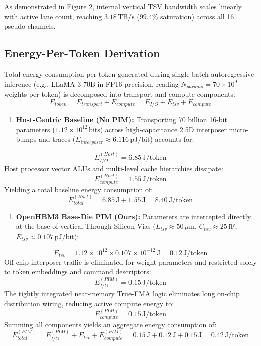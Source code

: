 \documentclass[journal,10pt,twocolumn]{IEEEtran}
\begin{document}
As demonstrated in Figure 2, internal vertical TSV bandwidth scales linearly with active lane count, reaching $3.18\,\text{TB/s}$ ($99.4\%$ saturation) across all 16 pseudo-channels.

\subsection{Energy-Per-Token Derivation}

Total energy consumption per token generated during single-batch autoregressive inference (e.g., LLaMA-3 70B in FP16 precision, reading $N_{params} = 70 \times 10^9$ weights per token) is decomposed into transport and compute components:
$$E_{token} = E_{transport} + E_{compute} = E_{I/O} + E_{tsv} + E_{compute}$$

\begin{enumerate}
  \item \textbf{Host-Centric Baseline (No PIM):}
Transporting 70 billion 16-bit parameters ($1.12 \times 10^{12}\,\text{bits}$) across high-capacitance 2.5D interposer micro-bumps and traces ($E_{interposer} \approx 6.116\,\text{pJ/bit}$) accounts for:
\end{enumerate}
$$E_{I/O}^{(Host)} = 6.85\,\text{J/token}$$
Host processor vector ALUs and multi-level cache hierarchies dissipate:
$$E_{compute}^{(Host)} = 1.55\,\text{J/token}$$
Yielding a total baseline energy consumption of:
$$E_{total}^{(Host)} = 6.85\,\text{J} + 1.55\,\text{J} = 8.40\,\text{J/token}$$

\begin{enumerate}
  \item \textbf{OpenHBM3 Base-Die PIM (Ours):}
Parameters are intercepted directly at the base of vertical Through-Silicon Vias ($L_{tsv} \approx 50\,\mu\text{m}$, $C_{tsv} \approx 25\,\text{fF}$, $E_{tsv} \approx 0.107\,\text{pJ/bit}$):
\end{enumerate}
$$E_{tsv} = 1.12 \times 10^{12} \times 0.107 \times 10^{-12}\,\text{J} = 0.12\,\text{J/token}$$
Off-chip interposer traffic is eliminated for weight parameters and restricted solely to token embeddings and command descriptors:
$$E_{I/O}^{(PIM)} = 0.15\,\text{J/token}$$
The tightly integrated near-memory True-FMA logic eliminates long on-chip distribution wiring, reducing active compute energy to:
$$E_{compute}^{(PIM)} = 0.15\,\text{J/token}$$
Summing all components yields an aggregate energy consumption of:
$$E_{total}^{(PIM)} = E_{I/O}^{(PIM)} + E_{tsv} + E_{compute}^{(PIM)} = 0.15\,\text{J} + 0.12\,\text{J} + 0.15\,\text{J} = 0.42\,\text{J/token}$$
\end{document}
